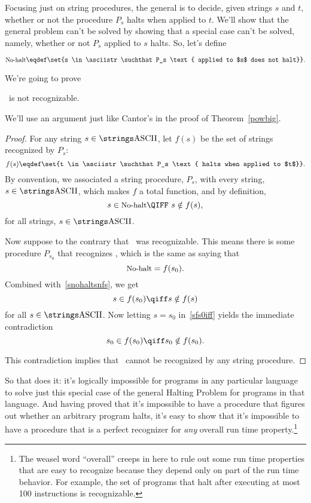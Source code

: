 Focusing just on string procedures, the general 
is to decide, given strings $s$ and $t$, whether or not the procedure
$P_s$ halts when applied to $t$.  We'll show that the general problem
can't be solved by showing that a special case can't be solved,
namely, whether or not $P_s$ applied to $s$ halts.  So, let's define
\begin{definition}\label{nohalt_def}
\begin{equation}\label{nohalt_eqdef}
\nohalt \eqdef \set{s \in \asciistr \suchthat P_s \text{ applied to
    $s$ does not halt}}.
\end{equation}
\end{definition}
We're going to prove
\begin{theorem}\label{nohalt_thm}
\nohalt\ is not recognizable.
\end{theorem}

We'll use an argument just like Cantor's in the proof of
Theorem~\ref{powbig}.

\begin{proof}
For any string $s \in \asciistr$, let
$f(s)$ be the set of strings recognized by $P_s$:
\[
f(s) \eqdef \set{t \in \asciistr \suchthat P_s \text{ halts when applied to
    $t$}}.
\]
By convention, we associated a string procedure, $P_s$, with every
string, $s \in \asciistr$, which makes $f$ a total function, and by
definition,
\begin{equation}\label{snohaltsnfs}
s \in \nohalt \QIFF\ s \notin f(s),
\end{equation}
for all strings, $s \in \asciistr$.

Now suppose to the contrary that \nohalt\ was recognizable.  This
means there is some procedure $P_{s_0}$ that recognizes \nohalt, which
is the same as saying that
\[
\text{\small{No-halt}} = f(s_0).
\]
Combined with~\eqref{snohaltsnfs}, we get
\begin{equation}\label{sfs0iff}
s \in f(s_0) \qiff s \notin f(s)
\end{equation}
for all $s \in \asciistr$.  Now letting $s = s_0$ in~\eqref{sfs0iff}
yields the immediate contradiction
\[
s_0 \in f(s_0) \qiff s_0 \notin f(s_0).
\]

This contradiction implies that \nohalt\ cannot be recognized by any
string procedure.
\end{proof}

So that does it: it's logically impossible for programs in any
particular language to solve just this special case of the general
Halting Problem for programs in that language.  And having proved that
it's impossible to have a procedure that figures out whether an
arbitrary program halts, it's easy to show that it's impossible to
have a procedure that is a perfect recognizer for \emph{any} overall
run time property.\footnote{The weasel word ``overall'' creeps in here
  to rule out some run time properties that are easy to recognize
  because they depend only on part of the run time behavior.  For
  example, the set of programs that halt after executing at most 100
  instructions is recognizable.}

